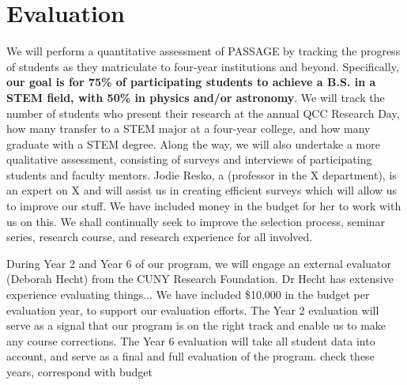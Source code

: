 \documentclass[12pt]{article}
\newcommand\new[1]{{\color{blue}#1}}
\begin{document}
\vspace{-5mm}


\section{\large{Evaluation}}
\vspace{-3mm}



We will perform a quantitative assessment of PASSAGE by tracking the progress of students as they matriculate to four-year institutions and beyond. Specifically, {\bf our goal is for 75\% of participating students to achieve a B.S. in a STEM field, with 50\% in physics and/or astronomy}. We will track the number of students who present their research at the annual QCC Research Day, how many transfer to a STEM major at a four-year college, and how many graduate with a STEM degree.  Along the way, we will also undertake a more qualitative assessment, consisting of surveys and interviews of participating students and faculty mentors.  \new{Jodie Resko, a (professor in the X department), is an expert on X and will assist us in creating efficient surveys which will allow us to improve our stuff.  We have included money in the budget for her to work with us on this.  } We shall continually seek to improve the selection process, seminar series, research course, and research experience for all involved.

During Year 2 and Year 6 of our program, we will engage an external evaluator (Deborah Hecht) from the CUNY Research Foundation.  \new{Dr Hecht has extensive experience evaluating things...}   We have included \$10,000 in the budget per evaluation year, to support our evaluation efforts.  The Year 2 evaluation will serve as a signal that our program is on the right track and enable us to make any course corrections.  The Year 6 evaluation will take all student data into account, and serve as a final and full evaluation of the program. \new{check these years, correspond with budget}
\vspace{-5mm}
\end{document}
